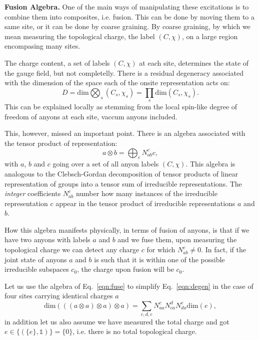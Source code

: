 \documentclass[two column]{article}
\begin{document}
\textbf{Fusion Algebra.} One of the main ways of manipulating these excitations is to combine them into composites, i.e. fusion. This can be done by moving them to a same site, or it can be done by coarse graining. By coarse graining, by which we mean measuring the topological charge, the label $(C, \chi)$, on a large region encompasing many sites.

The charge content, a set of labels $(C, \chi)$ at each site, determines the state of the gauge field, but not completelly. There is a residual degeneracy associated with the dimension of the space each of the onsite representation acts on: 
\begin{equation}
D = \text{dim}\bigotimes_s(C_s, \chi_s)=\prod_s \text{dim}(C_s, \chi_s). \label{eqn:degen}
\end{equation}
This can be explained locally as stemming from the local spin-like degree of freedom of anyons at each site, vaccum anyons included. 

This, however, missed an important point. There is an algebra associated with the tensor product of representation:
\begin{equation}
	a \otimes b = \bigoplus_{c}N^c_{ab} c,\label{eqn:fuse} 
\end{equation}
with $a$, $b$ and $c$ going over a set of all anyon labels $(C, \chi)$. This algebra is analogous to the Clebsch-Gordan decomposition of tensor products of linear representation of groups into a tensor sum of irreducible representations.
The \textit{integer} coefficients $N_{ab}^c$ number how many instances of the irreducible representation $c$ appear in the tensor product of irreducible representations $a$ and $b$.

How this algebra manifests physically, in terms of fusion of anyons, is that if we have two anyons with labels $a$ and $b$ and we fuse them, upon measuring the topological charge we can detect any charge $c$ for which $N_{ab}^c\neq 0$.
In fact, if the joint state of anyons $a$ and $b$ is such that it is within one of the possible irreducible subspaces $c_0$, the charge upon fusion will be $c_0$.

Let us use the algebra of Eq.~\eqref{eqn:fuse} to simplify Eq.~\eqref{eqn:degen} in the case of four sites carrying identical charges $a$
\begin{equation}
\text{dim}(((a\otimes a)\otimes a)\otimes a) = \sum_{c, d, e} N^c_{aa}N^d_{ca}N^e_{da}\text{dim}(e), \label{eqn:tree_bas}
\end{equation}
in addition let us also assume we have measured the total charge and got $e\in\{(\{e\}, \mathbb{1})\} = \{0\}$, i.e. there is no total topological charge.
\end{document}
